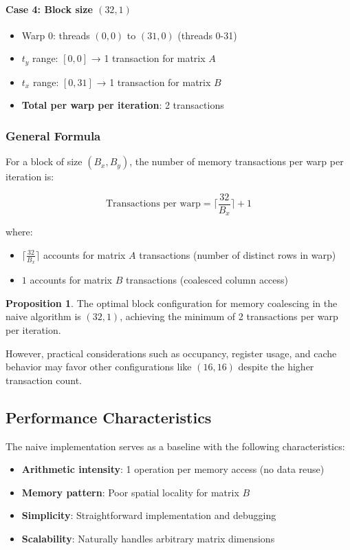 \documentclass{amsbook}
\theoremstyle{definition}
\newtheorem{proposition}{Proposition}[chapter]
\begin{document}
\paragraph{Case 4: Block size $(32, 1)$}
\begin{itemize}
\item Warp 0: threads $(0,0)$ to $(31,0)$ (threads 0-31)
\item $t_y$ range: $[0, 0]$ → 1 transaction for matrix $A$
\item $t_x$ range: $[0, 31]$ → 1 transaction for matrix $B$
\item \textbf{Total per warp per iteration}: 2 transactions
\end{itemize}

\subsubsection{General Formula}

For a block of size $(B_x, B_y)$, the number of memory transactions per warp per iteration is:

\begin{equation}
\text{Transactions per warp} = \lceil \frac{32}{B_x} \rceil + 1
\end{equation}

where:
\begin{itemize}
\item $\lceil \frac{32}{B_x} \rceil$ accounts for matrix $A$ transactions (number of distinct rows in warp)
\item $1$ accounts for matrix $B$ transactions (coalesced column access)
\end{itemize}

\begin{proposition}
The optimal block configuration for memory coalescing in the naive algorithm is $(32, 1)$, achieving the minimum of 2 transactions per warp per iteration.
\end{proposition}

However, practical considerations such as occupancy, register usage, and cache behavior may favor other configurations like $(16, 16)$ despite the higher transaction count.

\subsection{Performance Characteristics}

The naive implementation serves as a baseline with the following characteristics:
\begin{itemize}
\item \textbf{Arithmetic intensity}: 1 operation per memory access (no data reuse)
\item \textbf{Memory pattern}: Poor spatial locality for matrix $B$
\item \textbf{Simplicity}: Straightforward implementation and debugging
\item \textbf{Scalability}: Naturally handles arbitrary matrix dimensions
\end{itemize}
\end{document}
